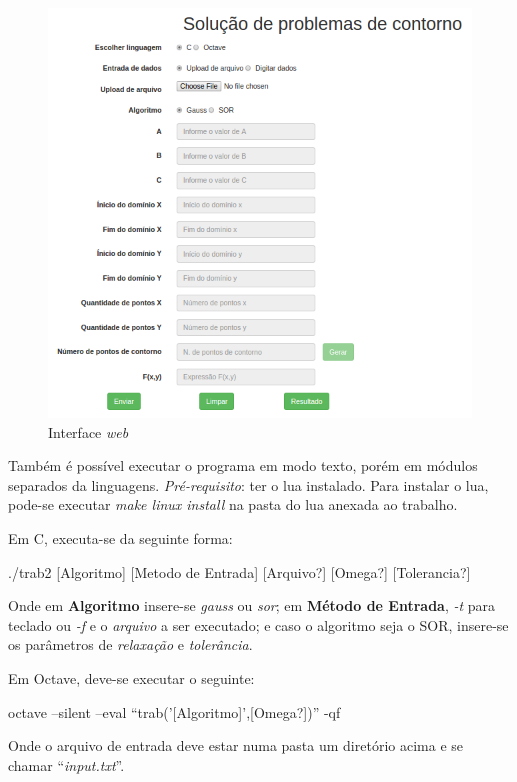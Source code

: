 \documentclass[
	11pt,				%
	oneside,			%
	a4paper,			%
	english,			%
	brazil,				%
	]{article}
\begin{document}
\begin{figure}[h]
\includegraphics[width=\textwidth]{interface.png}
\centering
\caption{Interface \textit{web}}
\label{fig:interface}
\end{figure}

Também é possível executar o programa em modo texto, porém em módulos separados da linguagens. \textit{Pré-requisito}: ter o lua instalado. Para instalar o lua, pode-se executar \textit{make linux install} na pasta do lua anexada ao trabalho.

Em C, executa-se da seguinte forma:

./trab2 [Algoritmo] [Metodo de Entrada] [Arquivo?] [Omega?] [Tolerancia?]

Onde em \textbf{Algoritmo} insere-se \textit{gauss} ou \textit{sor}; em \textbf{Método de Entrada}, \textit{-t} para teclado ou \textit{-f} e o \textit{arquivo} a ser executado; e caso o algoritmo seja o SOR, insere-se os parâmetros de \textit{relaxação} e \textit{tolerância}.

Em Octave, deve-se executar o seguinte:

octave --silent --eval ``trab('[Algoritmo]',[Omega?])'' -qf

Onde o arquivo de entrada deve estar numa pasta um diretório acima e se chamar ``\textit{input.txt}''.

\end{document}
